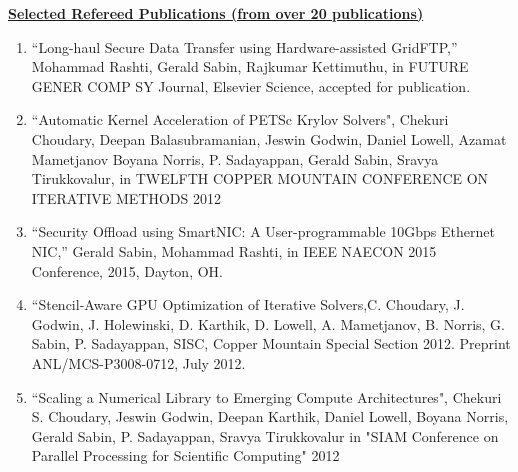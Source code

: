  {\bf {\underline{Selected Refereed Publications (from over 20 publications)}}}
 \begin{enumerate}
 	\setlength{\itemsep}{0.2pt}
 	
 	 \item ``Long-haul Secure Data Transfer using Hardware-assisted GridFTP,'' Mohammad Rashti, Gerald Sabin, Rajkumar Kettimuthu, in FUTURE GENER COMP SY Journal, Elsevier Science, accepted for publication.
 	
 	\item ``Automatic Kernel Acceleration of PETSc Krylov Solvers",
 	Chekuri Choudary, Deepan Balasubramanian, Jeswin Godwin, Daniel
 	Lowell, Azamat Mametjanov Boyana Norris, P. Sadayappan, Gerald
 	Sabin, Sravya Tirukkovalur, in TWELFTH COPPER MOUNTAIN CONFERENCE ON
 	ITERATIVE METHODS 2012
 	
 	\item ``Security Offload using SmartNIC: A User-programmable 10Gbps
 	Ethernet NIC,'' Gerald Sabin, Mohammad Rashti, in IEEE NAECON 2015
 	Conference, 2015, Dayton, OH.
 	
 	
 	\item ``Stencil-Aware GPU Optimization
 	of Iterative Solvers,C. Choudary, J. Godwin, J. Holewinski,
 	D. Karthik, D. Lowell, A. Mametjanov, B. Norris, G. Sabin,
 	P. Sadayappan, SISC, Copper Mountain Special Section 2012. Preprint
 	ANL/MCS-P3008-0712, July 2012.
 	
 	\item ``Scaling a Numerical Library to Emerging Compute
 	Architectures", Chekuri S. Choudary, Jeswin Godwin, Deepan Karthik,
 	Daniel Lowell, Boyana Norris, Gerald Sabin, P. Sadayappan, Sravya
 	Tirukkovalur in "SIAM Conference on Parallel Processing for
 	Scientific Computing" 2012
 	
 	
 	

\end{enumerate}
